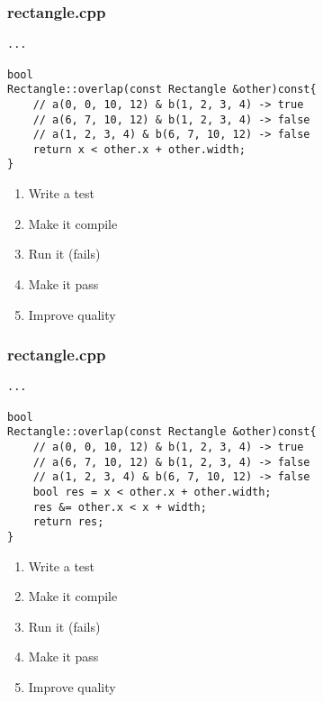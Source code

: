 \begin{frame}[fragile]
\frametitle{rectangle.cpp}
\begin{minipage}[t]{0.48\linewidth}
\begin{lstlisting}
...

bool 
Rectangle::overlap(const Rectangle &other)const{
    // a(0, 0, 10, 12) & b(1, 2, 3, 4) -> true
    // a(6, 7, 10, 12) & b(1, 2, 3, 4) -> false
    // a(1, 2, 3, 4) & b(6, 7, 10, 12) -> false
    return x < other.x + other.width;
}
\end{lstlisting}
\end{minipage}\hfill
\begin{minipage}[t]{0.28\linewidth}
  \small
  \begin{enumerate} 
    \item \textcolor{deadcolor}{Write a test}
    \item \textcolor{deadcolor}{Make it compile}
    \item \textcolor{deadcolor}{Run it (fails)}
    \item \textcolor{activecolor}{Make it pass}
    \item \textcolor{deadcolor}{Improve quality}
  \end{enumerate} 
\end{minipage}
\end{frame}


\begin{frame}[fragile]
\frametitle{rectangle.cpp}
\begin{minipage}[t]{0.48\linewidth}
\begin{lstlisting}
...

bool 
Rectangle::overlap(const Rectangle &other)const{
    // a(0, 0, 10, 12) & b(1, 2, 3, 4) -> true
    // a(6, 7, 10, 12) & b(1, 2, 3, 4) -> false
    // a(1, 2, 3, 4) & b(6, 7, 10, 12) -> false
    bool res = x < other.x + other.width;
    res &= other.x < x + width;
    return res;
}
\end{lstlisting}
\end{minipage}\hfill
\begin{minipage}[t]{0.28\linewidth}
  \small
  \begin{enumerate} 
    \item \textcolor{deadcolor}{Write a test}
    \item \textcolor{deadcolor}{Make it compile}
    \item \textcolor{deadcolor}{Run it (fails)}
    \item \textcolor{activecolor}{Make it pass}
    \item \textcolor{deadcolor}{Improve quality}
  \end{enumerate} 
\end{minipage}
\end{frame}


